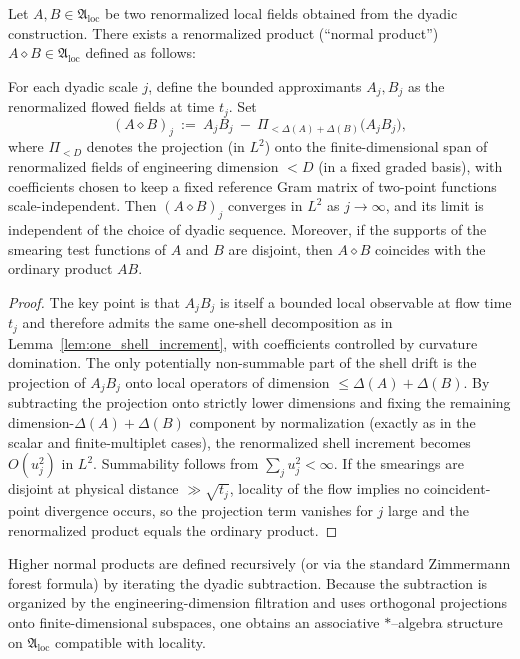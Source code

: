 \begin{proposition}
\label{prop:normal_products_multiscale}
Let $A,B\in\mathfrak A_{\mathrm{loc}}$ be two renormalized local fields obtained from the dyadic construction.
There exists a renormalized product (``normal product'') $A\diamond B\in\mathfrak A_{\mathrm{loc}}$ defined as follows:

\smallskip
\noindent
For each dyadic scale $j$, define the bounded approximants $A_j,B_j$ as the renormalized flowed fields at time $t_j$.
Set
\[
(A\diamond B)_j\ :=\ A_j B_j\ -\ \Pi_{<\Delta(A)+\Delta(B)}\bigl(A_j B_j\bigr),
\]
where $\Pi_{<D}$ denotes the projection (in $L^2$) onto the finite-dimensional span of renormalized fields of engineering dimension
$<D$ (in a fixed graded basis), with coefficients chosen to keep a fixed reference Gram matrix of two-point functions scale-independent.
Then $(A\diamond B)_j$ converges in $L^2$ as $j\to\infty$, and its limit is independent of the choice of dyadic sequence.
Moreover, if the supports of the smearing test functions of $A$ and $B$ are disjoint, then $A\diamond B$ coincides with the ordinary
product $AB$.
\end{proposition}

\begin{proof}
The key point is that $A_jB_j$ is itself a bounded local observable at flow time $t_j$ and therefore admits the same one-shell
decomposition as in Lemma~\ref{lem:one_shell_increment}, with coefficients controlled by curvature domination.
The only potentially non-summable part of the shell drift is the projection of $A_jB_j$ onto local operators of dimension
$\le \Delta(A)+\Delta(B)$.
By subtracting the projection onto strictly lower dimensions and fixing the remaining dimension-$\Delta(A)+\Delta(B)$ component by
normalization (exactly as in the scalar and finite-multiplet cases), the renormalized shell increment becomes $O(u_j^2)$ in $L^2$.
Summability follows from $\sum_j u_j^2<\infty$.
If the smearings are disjoint at physical distance $\gg \sqrt{t_j}$, locality of the flow implies no coincident-point divergence occurs,
so the projection term vanishes for $j$ large and the renormalized product equals the ordinary product.
\end{proof}

\begin{remark}
Higher normal products are defined recursively (or via the standard Zimmermann forest formula) by iterating the dyadic subtraction.
Because the subtraction is organized by the engineering-dimension filtration and uses orthogonal projections onto finite-dimensional
subspaces, one obtains an associative $*$--algebra structure on $\mathfrak A_{\mathrm{loc}}$ compatible with locality.
\end{remark}

